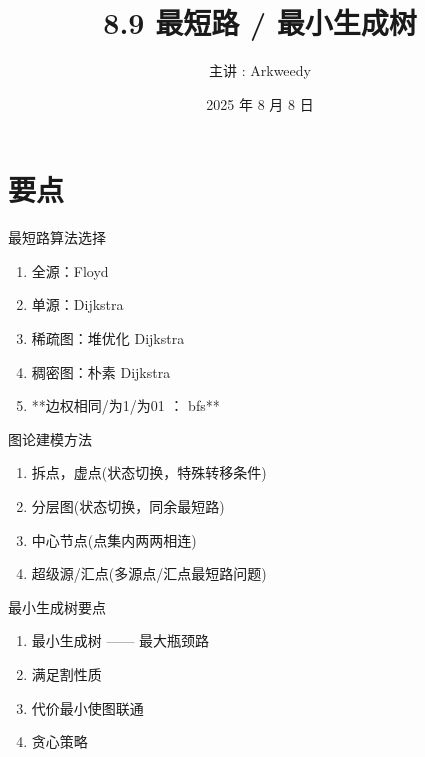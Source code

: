 \documentclass[11pt]{beamer}
\title{8.9 最短路 / 最小生成树}
\author{主讲 : Arkweedy}
\date{2025 年 8 月 8 日}
\begin{document}
\begin{frame}
  \titlepage
\end{frame}



\section{要点}
\begin{frame}{最短路算法选择}
    \begin{enumerate}
        \item 全源：Floyd
        \item 单源：Dijkstra
        \item 稀疏图：堆优化 Dijkstra
        \item 稠密图：朴素 Dijkstra
        \item **边权相同/为1/为01 ： bfs**
    \end{enumerate}
\end{frame}

\begin{frame}{图论建模方法}
    \begin{enumerate}
        \item 拆点，虚点(状态切换，特殊转移条件)
        \item 分层图(状态切换，同余最短路)
        \item 中心节点(点集内两两相连)
        \item 超级源/汇点(多源点/汇点最短路问题)
    \end{enumerate}
\end{frame}

\begin{frame}{最小生成树要点}
    \begin{enumerate}
        \item 最小生成树 —— 最大瓶颈路
        \item 满足割性质
        \item 代价最小使图联通
        \item 贪心策略
    \end{enumerate}
\end{frame}
\end{document}
